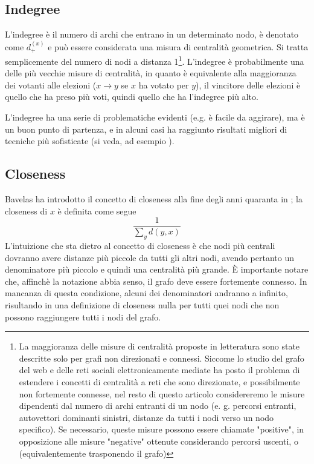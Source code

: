 \subsection{Indegree}
L'indegree è il numero di archi che entrano in un determinato nodo, è denotato come $d_+^{(x)}$ e può essere considerata una misura di centralità geometrica. Si tratta semplicemente del numero di nodi a distanza 1\footnote{La maggioranza delle misure di centralità proposte in letteratura sono state descritte solo per grafi non direzionati e connessi. Siccome lo studio del grafo del web e delle reti sociali elettronicamente mediate ha posto il problema di estendere i concetti di centralità a reti che sono direzionate, e possibilmente non fortemente connesse, nel resto di questo articolo considereremo le misure dipendenti dal numero di archi entranti di un nodo (e. g. percorsi entranti, autovettori dominanti sinistri, distanze da tutti i nodi verso un nodo specifico). Se necessario, queste misure possono essere chiamate "positive", in opposizione alle misure "negative" ottenute considerando percorsi uscenti, o (equivalentemente trasponendo il grafo)}. L'indegree è probabilmente una delle più vecchie misure di centralità, in quanto è equivalente alla maggioranza dei votanti alle elezioni ($x \rightarrow y$ se $x$ ha votato per $y$), il vincitore delle elezioni è quello che ha preso più voti, quindi quello che ha l'indegree più alto.

L'indegree ha una serie di problematiche evidenti (e.g. è facile da aggirare), ma è un buon punto di partenza, e in alcuni casi ha raggiunto risultati migliori di tecniche più sofisticate (si veda, ad esempio \cite{degree}).
\subsection{Closeness}
Bavelas ha introdotto il concetto di closeness alla fine degli anni quaranta in \cite{bavelas}; la closeness di $x$ è definita come segue
\begin{equation}
    \frac{1}{\sum_y{d(y, x)}}
\end{equation}
L'intuizione che sta dietro al concetto di closeness è che nodi più centrali dovranno avere distanze più piccole da tutti gli altri nodi, avendo pertanto un denominatore più piccolo e quindi una centralità più grande. È importante notare che, affinchè la notazione abbia senso, il grafo deve essere fortemente connesso. In mancanza di questa condizione, alcuni dei denominatori andranno a infinito, risultando in una definizione di closeness nulla per tutti quei nodi che non possono raggiungere tutti i nodi del grafo.

